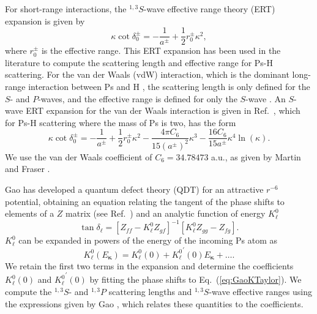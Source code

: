 \documentclass[preprint,showpacs,showkeys,preprintnumbers,amsmath,amssymb,longbibliography,pra,aps]{revtex4-1}
\begin{document}
{For short-range interactions, the $^{1,3}S$-wave effective range theory (ERT)
expansion is given by \cite{Bethe1949,Blatt1949}
\begin{equation}
\label{eq:EffectiveRangeShort}
\kappa \cot\delta_0^\pm = -\frac{1}{a^\pm} + \frac{1}{2} r_0^\pm \kappa^2,
\end{equation}
where $r_0^\pm$ is the effective range.
This ERT expansion has been used in the literature
\cite{Ivanov2002,VanReeth2003,Blackwood2002,Walters2004} to compute the
scattering length and effective range for Ps-H scattering. 
For the van der Waals (vdW) interaction, which is the dominant long-range
interaction between Ps and H \cite{Fabrikant2014,VanReeth2003,Au1986},
the scattering length is only defined for the $S$- and $P$-waves, and the 
effective range is defined for only the $S$-wave \cite{Levy1963}.
An $S$-wave ERT expansion for the van der Waals interaction is given in
Ref.~\cite{Drake2006}, which for Ps-H scattering where the mass of Ps
is two, has the form
\begin{equation}
\label{eq:EffectiveRangeLongAu}
\kappa \cot\delta_0^\pm = -\frac{1}{a^\pm} + \frac{1}{2} r_0^\pm \kappa^2 - 
  \frac{4 \pi C_6}{15 (a^\pm)^2} \kappa^3 - 
  \frac{16 C_6}{15 a^\pm} \kappa^4 \ln \left(\kappa \right).
\end{equation}
We use the van der Waals coefficient of $C_6 = 34.78473$ a.u., as given
by Martin and Fraser \cite{Martin1980}.

Gao \cite{Gao1998} has developed a quantum defect theory (QDT)
for an attractive $r^{-6}$ potential, obtaining an equation relating
the tangent of the phase shifts to elements of a $Z$ matrix
(see Ref.~\cite{Gao1998}) and an analytic function of energy $K_\ell^0$
\cite{Gao1998a}
\begin{equation}
\label{eq:GaoZEqn}
\tan\delta_\ell = [Z_{ff} - K_\ell^0 Z_{gf}]^{-1}
  [K_\ell^0 Z_{gg} - Z_{fg}].
\end{equation}
$K_\ell^0$ can be expanded in powers of the energy \cite{Gao1998a} of the
incoming Ps atom as
\begin{equation}
\label{eq:GaoKTaylor}
K_\ell^0(E_{\bm \kappa}) = K_\ell^0(0) + {K_\ell^0}^\prime(0) E_{\bm \kappa}
  + \ldots.
\end{equation}
We retain the first two terms in the expansion and determine the coefficients
$K_\ell^0(0)$ and ${K_\ell^0}^\prime(0)$ by fitting the phase shifts to
Eq.~(\ref{eq:GaoKTaylor}). We compute the $^{1,3}S$- and $^{1,3}P$ scattering
lengths and $^{1,3}S$-wave effective ranges using the expressions
given by Gao \cite{Gao1998a}, which relates these quantities to the
coefficients.


}
\end{document}
